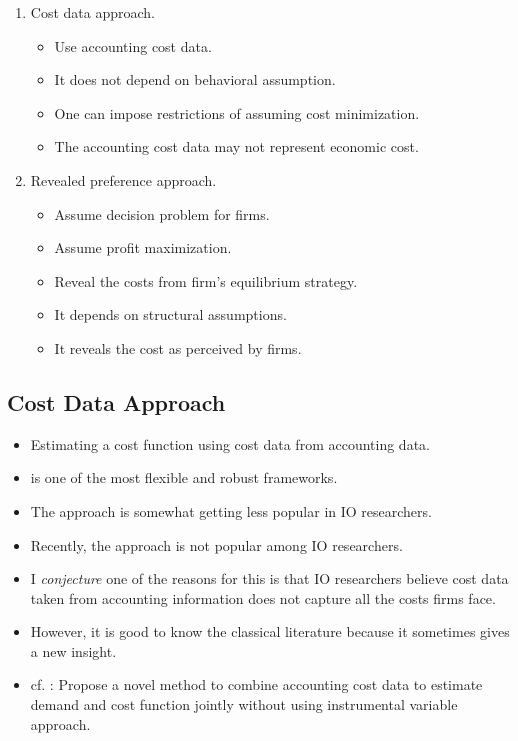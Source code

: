 \documentclass[
]{book}
\providecommand{\tightlist}{%
  \setlength{\itemsep}{0pt}\setlength{\parskip}{0pt}}
\begin{document}
\begin{enumerate}
\def\labelenumi{\arabic{enumi}.}
\tightlist
\item
  Cost data approach.

  \begin{itemize}
  \tightlist
  \item
    Use accounting cost data.
  \item
    It does not depend on behavioral assumption.
  \item
    One can impose restrictions of assuming cost minimization.
  \item
    The accounting cost data may not represent economic cost.
  \end{itemize}
\item
  Revealed preference approach.

  \begin{itemize}
  \tightlist
  \item
    Assume decision problem for firms.
  \item
    Assume profit maximization.
  \item
    Reveal the costs from firm's equilibrium strategy.
  \item
    It depends on structural assumptions.
  \item
    It reveals the cost as perceived by firms.
  \end{itemize}
\end{enumerate}

\hypertarget{cost-data-approach}{%
\subsection{Cost Data Approach}\label{cost-data-approach}}

\begin{itemize}
\tightlist
\item
  Estimating a cost function using cost data from accounting data.
\item
  \citet{McElroy1987} is one of the most flexible and robust frameworks.
\item
  The approach is somewhat getting less popular in IO researchers.
\item
  Recently, the approach is not popular among IO researchers.
\item
  I \textit{conjecture} one of the reasons for this is that IO researchers believe cost data taken from accounting information does not capture all the costs firms face.
\item
  However, it is good to know the classical literature because it sometimes gives a new insight.
\item
  cf. \citet{Byrne2015} : Propose a novel method to combine accounting cost data to estimate demand and cost function jointly without using instrumental variable approach.
\end{itemize}
\end{document}
